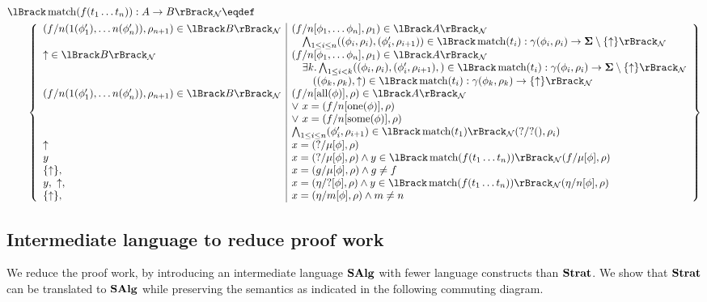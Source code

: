 \documentclass{article}
\newenvironment{rcases}
  {\left\lbrace\begin{array}{l|l}}
  {\end{array}\right\rbrace}
\begin{document}
\begin{align*}
  &\semn{\match{f(t_1 \ldots t_n)} : A \rightarrow B} \eqdef \\
  &\qquad
    \begin{rcases}
      (f/n(1(\phi_1'),\ldots n(\phi_n')),\rho_{n+1}) \in \semn{B}
        & (f/n[\phi_1,\ldots \phi_n],\rho_1) \in \semn{A} \\
        & \quad \bigwedge_{1 \leq i \leq n} ((\phi_i,\rho_i),(\phi_i',\rho_{i+1})) \in \semn{\match{t_i}: \gamma(\phi_i,\rho_i) \rightarrow \State\setminus \{\fail\} } \\
      \fail \in \semn{B}
        & (f/n[\phi_1,\ldots \phi_n],\rho_1) \in \semn{A} \\
        & \quad \exists k. \bigwedge_{1 \leq i < k} ((\phi_i,\rho_i),(\phi_i',\rho_{i+1}),) \in \semn{\match{t_i}: \gamma(\phi_i,\rho_i) \rightarrow \State\setminus \{\fail\} } \\
        & \quad\quad ((\phi_k,\rho_k),\fail) \in \semn{\match{t_i}: \gamma(\phi_k,\rho_k) \rightarrow \{\fail\} } \\
      (f/n(1(\phi_1'),\ldots n(\phi_n')),\rho_{n+1}) \in \semn{B} & (f/n[\all{\phi}],\rho) \in \semn{A} \\
        & \lor\ x = (f/n[\one{\phi}],\rho) \\
        & \lor\ x = (f/n[\some{\phi}],\rho) \\
        & \bigwedge_{1 \leq i \leq n} (\phi_i',\rho_{i+1}) \in \semn{\match{t_1}}(?/?(),\rho_i) \\
      \fail & x = (?/\mu[\phi],\rho) \\
      y & x = (?/\mu[\phi],\rho) \land y \in \semn{\match{f(t_1 \ldots t_n)}}(f/\mu[\phi],\rho) \\
      \{ \fail \}, & x = (g/\mu[\phi],\rho) \land g \neq f \\
      y,\ \fail, & x = (\eta/?[\phi],\rho) \land y \in \semn{\match{f(t_1 \ldots t_n)}}(\eta/n[\phi],\rho) \\
      \{ \fail \}, & x = (\eta/m[\phi],\rho) \land m \neq n \\
    \end{rcases} \\
\end{align*}

\subsection{Intermediate language to reduce proof work}

We reduce the proof work, by introducing an intermediate language $\mathbf{SAlg}$ with fewer language constructs than $\mathbf{Strat}$. We show that $\mathbf{Strat}$ can be translated to $\mathbf{SAlg}$ while preserving the semantics as indicated in the following commuting diagram.
\end{document}
